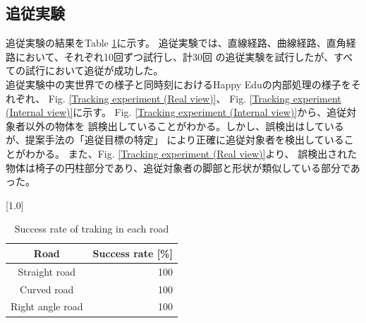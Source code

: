 \subsection{追従実験}
追従実験の結果をTable \ref{Success rate of traking in each road}に示す。
追従実験では、直線経路、曲線経路、直角経路において、それぞれ10回ずつ試行し、計30回
の追従実験を試行したが、すべての試行において追従が成功した。\\ \indent
追従実験中の実世界での様子と同時刻におけるHappy Eduの内部処理の様子をそれぞれ、
Fig. \ref{Tracking experiment (Real view)}、
Fig. \ref{Tracking experiment (Internal view)}に示す。
Fig. \ref{Tracking experiment (Internal view)}から、追従対象者以外の物体を
誤検出していることがわかる。しかし、誤検出はしているが、提案手法の「追従目標の特定」
により正確に追従対象者を検出していることがわかる。
また、Fig. \ref{Tracking experiment (Real view)}より、
誤検出された物体は椅子の円柱部分であり、追従対象者の脚部と形状が類似している部分であった。

\begin{table}[h]
  \begin{center}
    \caption{{Success rate of traking in each road}\label{Success rate of traking in each road}}
    \scalebox{1.2}[1.0]{
      \begin{tabular}{c|r} \hline
        Road & Success rate [\%] \\ \hline
        Straight road & 100 \\
        Curved road & 100 \\
        Right angle road & 100 \\ \hline
      \end{tabular}
    }
  \end{center}
\end{table}

